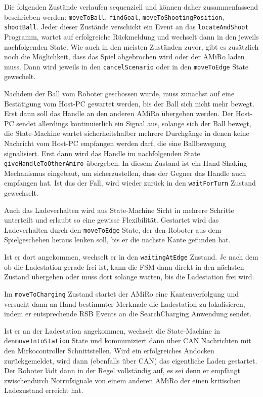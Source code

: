 Die folgenden Zustände verlaufen sequenziell und können daher zusammenfassend beschrieben werden:
\texttt{moveToBall}, \texttt{findGoal}, \texttt{moveToShootingPosition}, \texttt{shootBall}. Jeder dieser Zustände verschickt ein Event an das \texttt{locateAndShoot} Programm, wartet auf erfolgreiche Rückmeldung und wechselt dann in den jeweils nachfolgenden State. Wie auch in den meisten Zuständen zuvor, gibt es zusätzlich noch die Möglichkeit, dass das Spiel abgebrochen wird oder der AMiRo laden muss. Dann wird jeweils in den \texttt{cancelScenario} oder in den \texttt{moveToEdge} State gewechelt.

Nachdem der Ball vom Roboter geschossen wurde, muss zunächst auf eine Bestätigung vom Host-PC gewartet werden, bis der Ball sich nicht mehr bewegt. Erst dann soll das Handle an den anderen AMiRo übergeben werden. Der Host-PC sendet allerdings kontinuierlich ein Signal aus, solange sich der Ball bewegt, die State-Machine wartet sicherheitshalber mehrere Durchgänge in denen keine Nachricht vom Host-PC empfangen werden darf, die eine Ballbewegung signalisiert. Erst dann wird das Handle im nachfolgenden State \texttt{giveHandleToOtherAmiro} übergeben. In diesem Zustand ist ein Hand-Shaking Mechanismus eingebaut, um sicherzustellen, dass der Gegner das Handle auch empfangen hat. Ist das der Fall, wird wieder zurück in den \texttt{waitForTurn} Zustand gewechselt.

Auch das Ladeverhalten wird aus State-Machine Sicht in mehrere Schritte unterteilt und erlaubt so eine gewisse Flexibilität. Gestartet wird das Ladeverhalten durch den \texttt{moveToEdge} State, der den Roboter aus dem Spielgeschehen heraus lenken soll, bis er die nächste Kante gefunden hat.

Ist er dort angekommen, wechselt er in den \texttt{waitingAtEdge} Zustand. Je nach dem ob die Ladestation gerade frei ist, kann die FSM dann direkt in den nächsten Zustand übergehen oder muss dort solange warten, bis die Ladestation frei wird.

Im \texttt{moveToCharging} Zustand startet der AMiRo eine Kantenverfolgung und versucht dann an Hand bestimmter Merkmale die Ladestation zu lokalisieren, indem er entsprechende RSB Events an die SearchCharging Anwendung sendet.

Ist er an der Ladestation angekommen, wechselt die State-Machine in den\linebreak \texttt{moveIntoStation} State und kommuniziert dann über CAN Nachrichten mit den Mirkocontroller Schnittstellen. Wird ein erfolgreiches Andocken zurückgemeldet, wird dann (ebenfalls über CAN) das eigentliche Laden gestartet. Der Roboter lädt dann in der Regel vollständig auf, es sei denn er empfängt zwischendurch Notrufsignale von einem anderen AMiRo der einen kritischen Ladezustand erreicht hat. 


